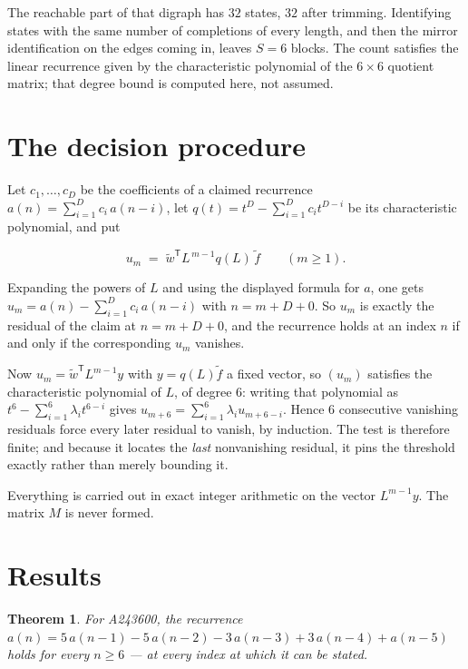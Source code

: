 \documentclass[11pt]{article}
\newtheorem{theorem}{Theorem}
\theoremstyle{definition}
\begin{document}
The reachable part of that digraph has $32$ states, $32$ after trimming. Identifying states with the same number of completions of every length, and then the mirror identification on the edges coming in, leaves $S = 6$ blocks. The count satisfies the linear recurrence given by the characteristic polynomial of the $6\times6$ quotient matrix; that degree bound is computed here, not assumed.

\section{The decision procedure}

Let $c_1,\dots,c_D$ be the coefficients of a claimed recurrence $a(n) = \sum_{i=1}^{D} c_i\,a(n-i)$, let $q(t) = t^{D} - \sum_{i=1}^{D} c_i t^{D-i}$ be its characteristic polynomial, and put

\[u_m \;=\; \tilde w^{\mathsf T} L^{\,m-1} q(L)\,\tilde f \qquad (m \ge 1).\]

Expanding the powers of $L$ and using the displayed formula for $a$, one gets $u_m = a(n) - \sum_{i=1}^{D} c_i\,a(n-i)$ with $n = m + D + 0$. So $u_m$ is exactly the residual of the claim at $n = m + D + 0$, and the recurrence holds at an index $n$ if and only if the corresponding $u_m$ vanishes.

Now $u_m = \tilde w^{\mathsf T} L^{m-1} y$ with $y = q(L)\tilde f$ a fixed vector, so $(u_m)$ satisfies the characteristic polynomial of $L$, of degree $6$: writing that polynomial as $t^{6} - \sum_{i=1}^{6} \lambda_i t^{6-i}$ gives $u_{m+6} = \sum_{i=1}^{6} \lambda_i u_{m+6-i}$. Hence $6$ consecutive vanishing residuals force every later residual to vanish, by induction. The test is therefore finite; and because it locates the {\itshape last} nonvanishing residual, it pins the threshold exactly rather than merely bounding it.

Everything is carried out in exact integer arithmetic on the vector $L^{m-1}y$. The matrix $M$ is never formed.

\section{Results}

\begin{theorem} For A243600, the recurrence $a(n) = 5\,a(n-1) - 5\,a(n-2) - 3\,a(n-3) + 3\,a(n-4) + a(n-5)$ holds for every $n \ge 6$ --- at every index at which it can be stated.\end{theorem}
\end{document}
